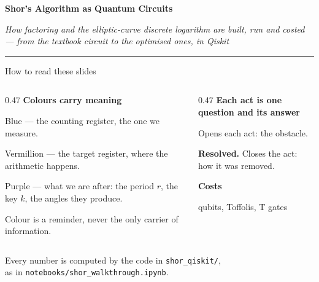 \documentclass[aspectratio=169,11pt]{beamer}
\newcommand{\cnt}[1]{\textcolor{cblue}{#1}}
\newcommand{\tgt}[1]{\textcolor{cverm}{#1}}
\newcommand{\per}[1]{\textcolor{cpurple}{#1}}
\newcommand{\blocktitle}[1]{{\bfseries #1}\par\vskip1mm}
\newcommand{\peachtitle}[1]{{\bfseries\color{cverm}#1}\par\vskip1mm}
\newcommand{\resolved}[1]{\begin{takeaway}\textbf{Resolved.} #1\end{takeaway}}
\begin{document}
{
\begin{frame}[noframenumbering]
  \vfill
  {\LARGE\bfseries Shor's Algorithm as Quantum Circuits\par}
  \vskip3mm
  {\itshape How factoring and the elliptic-curve discrete logarithm are built, run and costed\\
   --- from the textbook circuit to the optimised ones, in Qiskit\par}
  \vskip3mm{\color{rulegrey}\rule{0.62\textwidth}{0.4pt}}
  \vfill
\end{frame}}

\begin{frame}{How to read these slides}
  \begin{columns}[T]
    \begin{column}{0.47\textwidth}
      \blocktitle{Colours carry meaning}
      \cnt{Blue} --- the counting register, the one we measure.\par
      \tgt{Vermillion} --- the target register, where the arithmetic happens.\par
      \per{Purple} --- what we are after: the period $r$, the key $k$, the angles they produce.\par
      \vskip2mm
      {\color{subtle}\small Colour is a reminder, never the only carrier of information.}
    \end{column}
    \begin{column}{0.47\textwidth}
      \blocktitle{Each act is one question and its answer}
      \begin{difficulty}{}Opens each act: the obstacle.\end{difficulty}
      \resolved{Closes the act: how it was removed.}
      \begin{peachblock}\peachtitle{Costs}qubits, Toffolis, T gates\end{peachblock}
    \end{column}
  \end{columns}
  \vskip3mm
  {\color{subtle}\small Every number is computed by the code in \texttt{shor\_qiskit/},\\ as in \texttt{notebooks/shor\_walkthrough.ipynb}.}
\end{frame}
\end{document}
